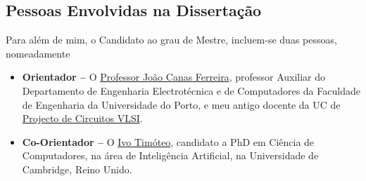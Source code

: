 \documentclass[a4paper, onecolumn, 10pt]{article}
\begin{document}
	\subsection{Pessoas Envolvidas na Dissertação}
	Para além de mim, o Candidato ao grau de Mestre, incluem-se duas pessoas, nomeadamente

	\begin{itemize}
		\item
			\textbf{Orientador --} O \href{https://sigarra.up.pt/feup/pt/func_geral.formview?p_codigo=210963}{Professor João Canas Ferreira}, professor Auxiliar do Departamento de Engenharia Electrotécnica e de Computadores da Faculdade de Engenharia da Universidade do Porto, e meu antigo docente da UC de \href{https://sigarra.up.pt/feup/pt/UCURR_GERAL.FICHA_UC_VIEW?pv_ocorrencia_id=352359}{Projecto de Circuitos VLSI}.
		\item
			\textbf{Co-Orientador --} O \href{http://www.cl.cam.ac.uk/~ijpdmt2/}{Ivo Timóteo}, candidato a PhD em Ciência de Computadores, na área de Inteligência Artificial, na Universidade de Cambridge, Reino Unido.
	
	\end{itemize}	
\end{document}

